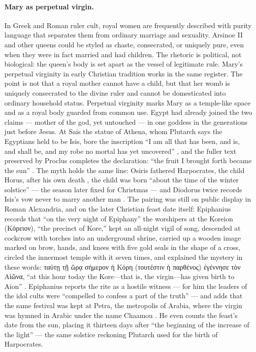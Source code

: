 \paragraph{Mary as perpetual virgin.}
In Greek and Roman ruler cult, royal women are frequently described with purity language that separates them from ordinary marriage and sexuality.
Arsinoe II and other queens could be styled as chaste, consecrated, or uniquely pure, even when they were in fact married and had children.
The rhetoric is political, not biological: the queen's body is set apart as the vessel of legitimate rule.
Mary's perpetual virginity in early Christian tradition works in the same register.
The point is not that a royal mother cannot have a child, but that her womb is uniquely consecrated to the divine ruler and cannot be domesticated into ordinary household status.
Perpetual virginity marks Mary as a temple-like space and as a royal body guarded from common use.
Egypt had already joined the two claims --- mother of the god, yet untouched --- in one goddess in the generations just before Jesus.
At Sais the statue of Athena, whom Plutarch says the Egyptians held to be Isis, bore the inscription ``I am all that has been, and is, and shall be, and my robe no mortal has yet uncovered'' \cite[9]{plutarch:deiside}, and the fuller text preserved by Proclus completes the declaration: ``the fruit I brought forth became the sun'' \cite[Book 1, on Timaeus 21e]{proclus:intimaeum}.
The myth holds the same line: Osiris fathered Harpocrates, the child Horus, after his own death \cite[19]{plutarch:deiside}, the child was born ``about the time of the winter solstice'' \cite[65]{plutarch:deiside} --- the season later fixed for Christmas --- and Diodorus twice records Isis's vow never to marry another man \cite[1.22, 1.27]{diodorus:library}.
The pairing was still on public display in Roman Alexandria, and on the later Christian feast date itself: Epiphanius records that ``on the very night of Epiphany'' the worshipers at the Koreion (Κόρειον), ``the precinct of Kore,'' kept an all-night vigil of song, descended at cockcrow with torches into an underground shrine, carried up a wooden image marked on brow, hands, and knees with five gold seals in the shape of a cross, circled the innermost temple with it seven times, and explained the mystery in these words: ταύτῃ τῇ ὥρᾳ σήμερον ἡ Κόρη (τουτέστιν ἡ παρθένος) ἐγέννησε τὸν Αἰῶνα, ``at this hour today the Kore---that is, the virgin---has given birth to Aion'' \cite[51.22]{epiphanius:panarion}.
Epiphanius reports the rite as a hostile witness --- for him the leaders of the idol cults were ``compelled to confess a part of the truth'' --- and adds that the same festival was kept at Petra, the metropolis of Arabia, where the virgin was hymned in Arabic under the name Chaamou \cite[51.22]{epiphanius:panarion}.
He even counts the feast's date from the sun, placing it thirteen days after ``the beginning of the increase of the light'' \cite[51.22]{epiphanius:panarion} --- the same solstice reckoning Plutarch used for the birth of Harpocrates.

